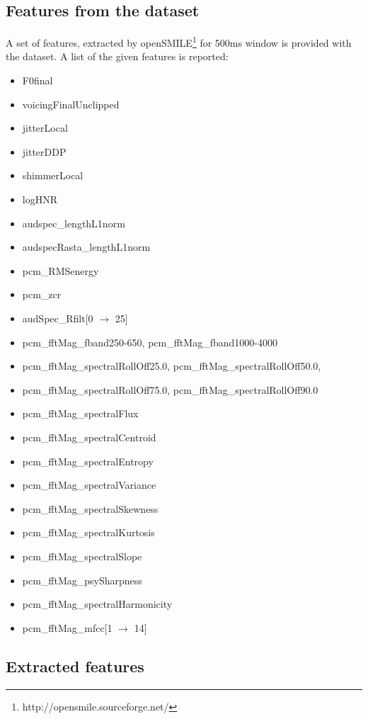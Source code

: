 \subsection{Features from the dataset}

A set of features, extracted by openSMILE\footnote{http://opensmile.sourceforge.net/} for 500ms window is provided with the dataset. 
A list of the given features is reported:


\begin{itemize}
	\item F0final
	\item voicingFinalUnclipped
	\item jitterLocal
	\item jitterDDP
	\item shimmerLocal
	\item logHNR
	\item audspec\_lengthL1norm
	\item audspecRasta\_lengthL1norm
	\item pcm\_RMSenergy
	\item pcm\_zcr
	\item audSpec\_Rfilt[0 $\rightarrow$ 25]
	\item pcm\_fftMag\_fband250-650, pcm\_fftMag\_fband1000-4000
	\item pcm\_fftMag\_spectralRollOff25.0, pcm\_fftMag\_spectralRollOff50.0, 
	\item pcm\_fftMag\_spectralRollOff75.0, pcm\_fftMag\_spectralRollOff90.0
	\item pcm\_fftMag\_spectralFlux
	\item pcm\_fftMag\_spectralCentroid
	\item pcm\_fftMag\_spectralEntropy
	\item pcm\_fftMag\_spectralVariance
	\item pcm\_fftMag\_spectralSkewness
	\item pcm\_fftMag\_spectralKurtosis
	\item pcm\_fftMag\_spectralSlope
	\item pcm\_fftMag\_psySharpness
	\item pcm\_fftMag\_spectralHarmonicity
	\item pcm\_fftMag\_mfcc[1 $\rightarrow$ 14]
\end{itemize}


\subsection{Extracted features}

